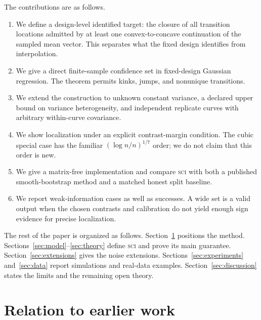 \documentclass{interact}
\theoremstyle{definition}
\theoremstyle{remark}
\newcommand{\SCI}{\textnormal{\textsc{sci}}\xspace}
\begin{document}
The contributions are as follows.
\begin{enumerate}[leftmargin=*,itemsep=2pt]
  \item We define a design-level identified target: the closure of all
  transition locations admitted by at least one convex-to-concave continuation
  of the sampled mean vector.  This separates what the fixed design identifies
  from interpolation.
  \item We give a direct finite-sample confidence set in fixed-design Gaussian
  regression.  The theorem permits kinks, jumps, and nonunique transitions.
  \item We extend the construction to unknown constant variance, a declared
  upper bound on variance heterogeneity, and independent replicate curves with
  arbitrary within-curve covariance.
  \item We show localization under an explicit contrast-margin condition.  The
  cubic special case has the familiar $(\log n/n)^{1/7}$ order; we do not claim
  that this order is new.
  \item We give a matrix-free implementation and compare \SCI with both a
  published smooth-bootstrap method and a matched honest split baseline.
  \item We report weak-information cases as well as successes.  A wide set is
  a valid output when the chosen contrasts and calibration do not yield
  enough sign evidence for precise localization.
\end{enumerate}

The rest of the paper is organized as follows.  Section~\ref{sec:related}
positions the method.  Sections~\ref{sec:model}--\ref{sec:theory} define \SCI
and prove its main guarantee.  Section~\ref{sec:extensions} gives the noise
extensions.  Sections~\ref{sec:experiments} and~\ref{sec:data} report simulations
and real-data examples.  Section~\ref{sec:discussion} states the limits and the
remaining open theory.

\section{Relation to earlier work}
\label{sec:related}
\end{document}
